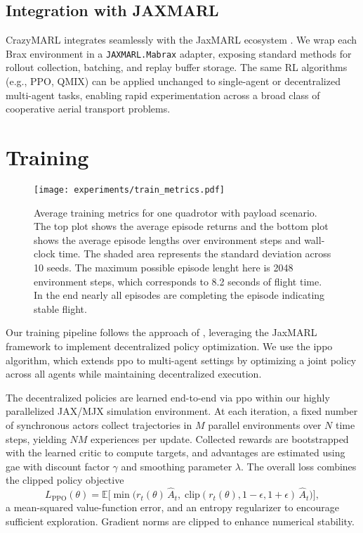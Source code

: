 \subsection{Integration with JAXMARL}

CrazyMARL integrates seamlessly with the JaxMARL ecosystem \cite{flair2023jaxmarl}.  We wrap each Brax environment in a \texttt{JAXMARL.Mabrax} adapter, exposing standard methods for rollout collection, batching, and replay buffer storage.  The same RL algorithms (e.g., PPO, QMIX) can be applied unchanged to single-agent or decentralized multi-agent tasks, enabling rapid experimentation across a broad class of cooperative aerial transport problems.


\section{Training}
\begin{figure}[ht]
    \centering
    
    \texttt{[image: experiments/train\_metrics.pdf]}
    \caption[Training metrics]{Average training metrics for one quadrotor with payload scenario. The top plot shows the average episode returns and the bottom plot shows the average episode lengths over environment steps and wall-clock time. The shaded area represents the standard deviation across 10 seeds. The maximum possible episode lenght here is 2048 environment steps, which corresponds to 8.2 seconds of flight time. In the end nearly all episodes are completing the episode indicating stable flight.}
    \label{fig:train_metrics}
\end{figure}
Our training pipeline follows the approach of \autocite{flair2023jaxmarl}, leveraging the JaxMARL framework to implement decentralized policy optimization. We use the \gls{ippo} algorithm, which extends \gls{ppo} to multi-agent settings by optimizing a joint policy across all agents while maintaining decentralized execution.

The decentralized policies are learned end-to-end via \gls{ppo} within our highly parallelized JAX/MJX simulation environment. At each iteration, a fixed number of synchronous actors collect trajectories in $M$ parallel environments over $N$ time steps, yielding $NM$ experiences per update. Collected rewards are bootstrapped with the learned critic to compute targets, and advantages are estimated using \gls{gae} with discount factor $\gamma$ and smoothing parameter $\lambda$. The overall loss combines the clipped policy objective
\[
L_{\mathrm{PPO}}(\theta) = \mathbb{E}\!\bigl[\min\bigl(r_t(\theta)\,\hat{A}_t,\;\mathrm{clip}(r_t(\theta),1-\epsilon,1+\epsilon)\,\hat{A}_t\bigr)\bigr],
\]
a mean-squared value-function error, and an entropy regularizer to encourage sufficient exploration. Gradient norms are clipped to enhance numerical stability.

